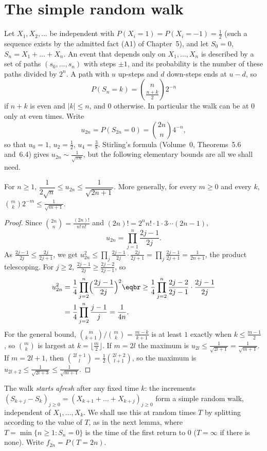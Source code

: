 \section{The simple random walk}

Let $X_1,X_2,\ldots$ be independent with $P(X_i=1)=P(X_i=-1)=\frac12$ (such a sequence exists by the admitted fact (A1)
of Chapter~5), and let $S_0=0$, $S_n=X_1+\dots+X_n$. An event that depends only on $X_1,\dots,X_n$ is described by a set of
paths $(s_0,\dots,s_n)$ with steps $\pm1$, and its probability is the number of these paths divided by $2^n$. A path with
$u$ up-steps and $d$ down-steps ends at $u-d$, so
\[
P(S_n=k)=\binom n{\frac{n+k}2}2^{-n}
\]
if $n+k$ is even and $|k|\le n$, and $0$ otherwise. In particular the walk can be at $0$ only at even times. Write
\[
u_{2n}=P(S_{2n}=0)=\binom{2n}n4^{-n},
\]
so that $u_0=1$, $u_2=\frac12$, $u_4=\frac38$. Stirling's formula (Volume~0, Theorems~5.6 and~6.4) gives $u_{2n}\sim\frac1{\sqrt{\pi n}}$, but the following
elementary bounds are all we shall need.

\begin{lemma}\label{lem:central}
For $n\ge1$, $\dfrac1{2\sqrt n}\le u_{2n}\le\dfrac1{\sqrt{2n+1}}$. More generally, for every $m\ge0$ and every $k$, $\binom mk2^{-m}\le\frac1{\sqrt{m+1}}$.
\end{lemma}
\begin{proof}
Since $\binom{2n}n=\frac{(2n)!}{n!\,n!}$ and $(2n)!=2^nn!\cdot1\cdot3\cdots(2n-1)$,
\[
u_{2n}=\prod_{j=1}^n\frac{2j-1}{2j}.
\]
As $\frac{2j-1}{2j}\le\frac{2j}{2j+1}$, we get $u_{2n}^2\le\prod_j\frac{2j-1}{2j}\cdot\frac{2j}{2j+1}=\prod_j\frac{2j-1}{2j+1}=\frac1{2n+1}$, the product telescoping. For $j\ge2$,
$\frac{2j-1}{2j}\ge\frac{2j-2}{2j-1}$, so
\[
\begin{aligned}u_{2n}^2&=\frac14\prod_{j=2}^n\Bigl(\frac{2j-1}{2j}\Bigr)^2\eqbr\ge\frac14\prod_{j=2}^n\frac{2j-2}{2j-1}\cdot\frac{2j-1}{2j}\\&=\frac14\prod_{j=2}^n\frac{j-1}j=\frac1{4n}.\end{aligned}
\]
For the general bound, $\binom m{k+1}/\binom mk=\frac{m-k}{k+1}$ is at least $1$ exactly when $k\le\frac{m-1}2$, so $\binom mk$ is largest at
$k=\lfloor\frac m2\rfloor$. If $m=2l$ the maximum is $u_{2l}\le\frac1{\sqrt{2l+1}}=\frac1{\sqrt{m+1}}$. If $m=2l+1$, then $\binom{2l+1}l=\frac12\binom{2l+2}{l+1}$, so the
maximum is $u_{2l+2}\le\frac1{\sqrt{2l+3}}\le\frac1{\sqrt{m+1}}$.
\end{proof}

The walk \emph{starts afresh} after any fixed time $k$: the increments $(S_{k+j}-S_k)_{j\ge0}=(X_{k+1}+\dots+X_{k+j})_{j\ge0}$ form a
simple random walk, independent of $X_1,\dots,X_k$. We shall use this at random times $T$ by splitting according to the value of
$T$, as in the next lemma, where $T=\min\{n\ge1:S_n=0\}$ is the time of the first return to $0$ ($T=\infty$ if there is none).
Write $f_{2n}=P(T=2n)$.

